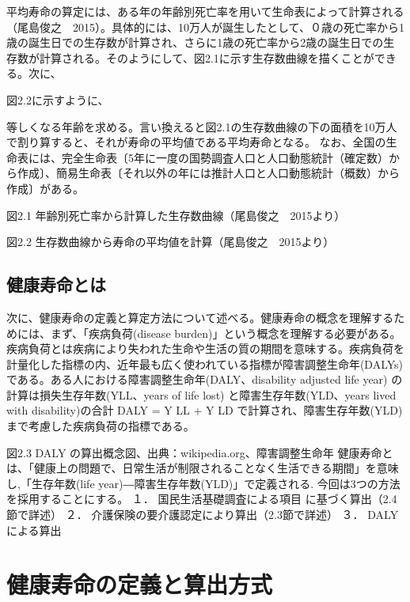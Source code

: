 平均寿命の算定には、ある年の年齢別死亡率を用いて生命表によって計算される（尾島俊之　2015）。具体的には、10万人が誕生したとして、０歳の死亡率から1歳の誕生日での生存数が計算され、さらに1歳の死亡率から2歳の誕生日での生存数が計算される。そのようにして、図2.1に示す生存数曲線を描くことができる。次に、

図2.2に示すように、

等しくなる年齢を求める。言い換えると図2.1の生存数曲線の下の面積を10万人で割り算すると、それが寿命の平均値である平均寿命となる。
なお、全国の生命表には、完全生命表〔5年に一度の国勢調査人口と人口動態統計（確定数）から作成〕、簡易生命表〔それ以外の年には推計人口と人口動態統計（概数）から作成〕がある。



図2.1 年齢別死亡率から計算した生存数曲線（尾島俊之　2015より）

図2.2 生存数曲線から寿命の平均値を計算（尾島俊之　2015より）




\subsection{健康寿命とは}


次に、健康寿命の定義と算定方法について述べる。健康寿命の概念を理解するためには、まず、「疾病負荷(disease burden)」という概念を理解する必要がある。疾病負荷とは疾病により失われた生命や生活の質の期間を意味する。疾病負荷を計量化した指標の内、近年最も広く使われている指標が障害調整生命年(DALYs) である。ある人における障害調整生命年(DALY、disability adjusted life year) の計算は損失生存年数(YLL、years of life lost) と障害生存年数(YLD、years lived with disability)の合計
DALY = Y LL + Y LD
で計算され、障害生存年数(YLD)まで考慮した疾病負荷の指標である。

図2.3 DALY の算出概念図、出典：wikipedia.org、障害調整生命年
健康寿命とは、「健康上の問題で、日常生活が制限されることなく生活できる期間」を意味し,「生存年数(life year)―障害生存年数(YLD)」で定義される.
今回は3つの方法を採用することにする。
１．	国民生活基礎調査による項目  に基づく算出（2.4節で詳述）
２．	介護保険の要介護認定により算出（2.3節で詳述）
３．	DALYによる算出


\section{健康寿命の定義と算出方式}

